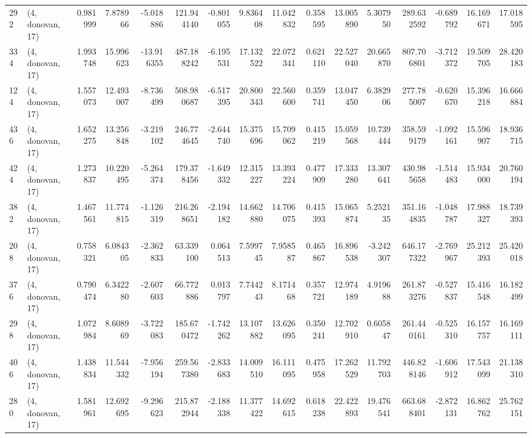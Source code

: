 \begin{tabular}{llrrrrrrrrrrrrrr}
292 &  (4, donovan, 17) &   0.981999 &   7.878966 &  -5.018886 &   121.944140 &  -0.801055 &   9.836408 &  11.042832 &  0.358595 &  13.005890 &   5.307950 &    289.632592 &   -0.689792 &   16.169671 &   17.018595 \\
334 &  (4, donovan, 17) &   1.993748 &  15.996623 & -13.916355 &   487.188242 &  -6.195531 &  17.132522 &  22.072341 &  0.621110 &  22.527040 &  20.665870 &    807.706801 &   -3.712372 &   19.509705 &   28.420183 \\
124 &  (4, donovan, 17) &   1.557073 &  12.493007 &  -8.736499 &   508.980687 &  -6.517395 &  20.800343 &  22.560600 &  0.359741 &  13.047450 &   6.382906 &    277.785007 &   -0.620670 &   15.396218 &   16.666884 \\
436 &  (4, donovan, 17) &   1.652275 &  13.256848 &  -3.219102 &   246.774645 &  -2.644740 &  15.375696 &  15.709062 &  0.415219 &  15.059568 &  10.739444 &    358.599179 &   -1.092161 &   15.596907 &   18.936715 \\
424 &  (4, donovan, 17) &   1.273837 &  10.220495 &  -5.264374 &   179.378456 &  -1.649332 &  12.315227 &  13.393224 &  0.477909 &  17.333280 &  13.307641 &    430.985658 &   -1.514483 &   15.934000 &   20.760194 \\
382 &  (4, donovan, 17) &   1.467561 &  11.774815 &  -1.126319 &   216.268651 &  -2.194182 &  14.662880 &  14.706075 &  0.415393 &  15.065874 &   5.252135 &    351.164835 &   -1.048787 &   17.988327 &   18.739393 \\
208 &  (4, donovan, 17) &   0.758321 &   6.084305 &  -2.362833 &    63.339100 &   0.064513 &   7.599745 &   7.958587 &  0.465867 &  16.896538 &  -3.242307 &    646.177322 &   -2.769967 &   25.212393 &   25.420018 \\
376 &  (4, donovan, 17) &   0.790474 &   6.342280 &  -2.607603 &    66.772886 &   0.013797 &   7.744243 &   8.171468 &  0.357721 &  12.974189 &   4.919688 &    261.873276 &   -0.527837 &   15.416548 &   16.182499 \\
298 &  (4, donovan, 17) &   1.072984 &   8.608969 &  -3.722083 &   185.670472 &  -1.742262 &  13.107882 &  13.626095 &  0.350241 &  12.702910 &   0.605847 &    261.440161 &   -0.525310 &   16.157757 &   16.169111 \\
406 &  (4, donovan, 17) &   1.438834 &  11.544332 &  -7.956194 &   259.567380 &  -2.833683 &  14.009510 &  16.111095 &  0.475958 &  17.262529 &  11.792703 &    446.828146 &   -1.606912 &   17.543099 &   21.138310 \\
280 &  (4, donovan, 17) &   1.581961 &  12.692695 &  -9.296623 &   215.872944 &  -2.188338 &  11.377422 &  14.692615 &  0.618238 &  22.422893 &  19.476541 &    663.688401 &   -2.872131 &   16.862762 &   25.762151 \\

\end{tabular}
